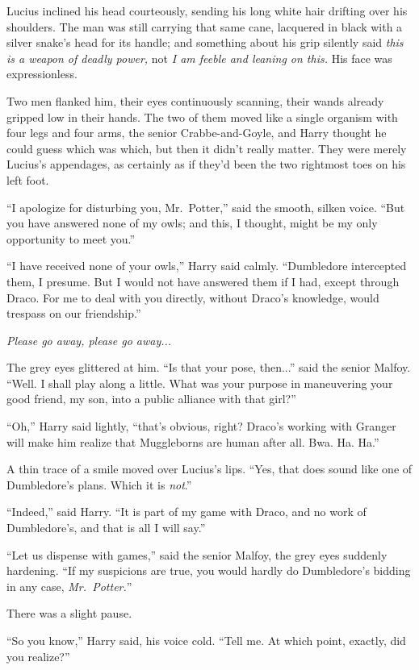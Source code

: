 Lucius inclined his head courteously, sending his long white hair drifting over his shoulders. The man was still carrying that same cane, lacquered in black with a silver snake’s head for its handle; and something about his grip silently said \emph{this is a weapon of deadly power,} not \emph{I am feeble and leaning on this.} His face was expressionless.

Two men flanked him, their eyes continuously scanning, their wands already gripped low in their hands. The two of them moved like a single organism with four legs and four arms, the senior Crabbe-and-Goyle, and Harry thought he could guess which was which, but then it didn’t really matter. They were merely Lucius’s appendages, as certainly as if they’d been the two rightmost toes on his left foot.

“I apologize for disturbing you, Mr.~Potter,” said the smooth, silken voice. “But you have answered none of my owls; and this, I thought, might be my only opportunity to meet you.”

“I have received none of your owls,” Harry said calmly. “Dumbledore intercepted them, I presume. But I would not have answered them if I had, except through Draco. For me to deal with you directly, without Draco’s knowledge, would trespass on our friendship.”

\emph{Please go away, please go away...}

The grey eyes glittered at him. “Is that your pose, then...” said the senior Malfoy. “Well. I shall play along a little. What was your purpose in maneuvering your good friend, my son, into a public alliance with that girl?”

“Oh,” Harry said lightly, “that’s obvious, right? Draco’s working with Granger will make him realize that Muggleborns are human after all. Bwa. Ha. Ha.”

A thin trace of a smile moved over Lucius’s lips. “Yes, that does sound like one of Dumbledore’s plans. Which it is \emph{not}.”

“Indeed,” said Harry. “It is part of my game with Draco, and no work of Dumbledore’s, and that is all I will say.”

“Let us dispense with games,” said the senior Malfoy, the grey eyes suddenly hardening. “If my suspicions are true, you would hardly do Dumbledore’s bidding in any case, \emph{Mr.~Potter.}”

There was a slight pause.

“So you know,” Harry said, his voice cold. “Tell me. At which point, exactly, did you realize?”

